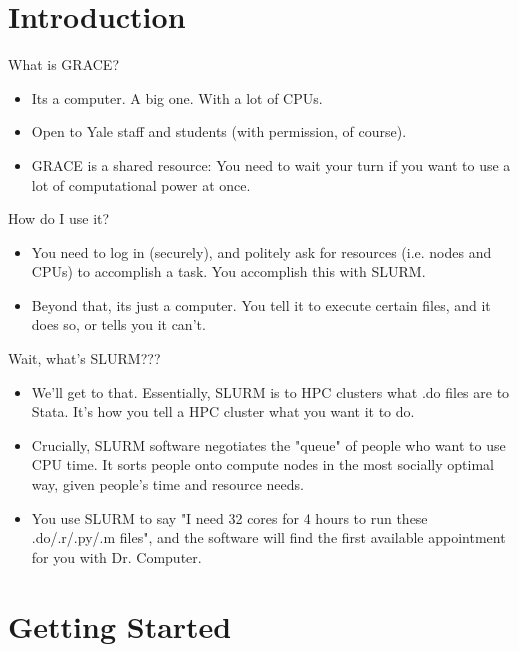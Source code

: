 \documentclass[10pt,xcolor={svgnames}]{beamer}
\begin{document}
\section{Introduction}




\begin{frame}{What is GRACE?}
	\begin{itemize}
	\item Its a computer. A big one. With a lot of CPUs.
	\item Open to Yale staff and students (with permission, of course).
	\item GRACE is a shared resource: You need to wait your turn if you want to use a lot of computational power at once.
	\end{itemize}
\end{frame}


\begin{frame}{How do I use it?}
	\begin{itemize}
	\item You need to log in (securely), and politely ask for resources (i.e. nodes and CPUs) to accomplish a task. You accomplish this with SLURM.
	\item Beyond that, its just a computer. You tell it to execute certain files, and it does so, or tells you it can't.
	\end{itemize}
\end{frame}

\begin{frame}{Wait, what's SLURM???}
	\begin{itemize}
	\item We'll get to that. Essentially, SLURM is to HPC clusters what .do files are to Stata. It's how you tell a HPC cluster what you want it to do.
	\item Crucially, SLURM software negotiates the "queue" of people who want to use CPU time. It sorts people onto compute nodes in the most socially optimal way, given people's time and resource needs. 
	\item You use SLURM to say "I need 32 cores for 4 hours to run these .do/.r/.py/.m files", and the software will find the first available appointment for you with Dr. Computer.
	\end{itemize}
\end{frame}

\section{Getting Started}
\end{document}
